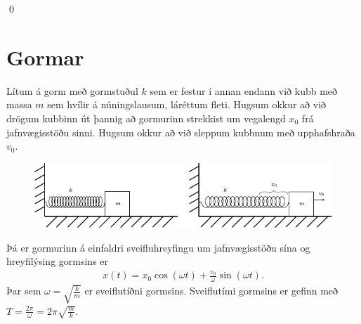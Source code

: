 \ifdefined \wholebook \else\documentclass[oneside]{book}\usepackage{EdlBook}\graphicspath{{figures/}}
\begin{document}
\qed



\section{Gormar}

\begin{tcolorbox}
\begin{theorem} \label{law:springs}
Lítum á gorm með gormstuðul $k$ sem er festur í annan endann við kubb með massa $m$ sem hvílir á núningslausum, láréttum fleti. Hugsum okkur að við drögum kubbinn út þannig að gormurinn strekkist um vegalengd $x_0$ frá jafnvægisstöðu sinni. Hugsum okkur að við sleppum kubbnum með upphafshraða $v_0$.

\begin{figure}[H]
    \centering
    \includegraphics{figures/springsystem2.pdf}
\end{figure}
Þá er gormurinn á einfaldri sveifluhreyfingu um jafnvægisstöðu sína og hreyfilýsing gormsins er
\begin{align*}
    x(t) = x_0 \cos(\omega t) + \frac{v_0}{\omega} \sin(\omega t).
\end{align*}
Þar sem $\omega = \sqrt{\frac{k}{m}}$ er sveiflutíðni gormsins. Sveiflutími gormsins er gefinn með $T = \frac{2\pi}{\omega} = 2\pi \sqrt{\frac{m}{k}}$.
\end{theorem}
\end{tcolorbox}
\end{document}
